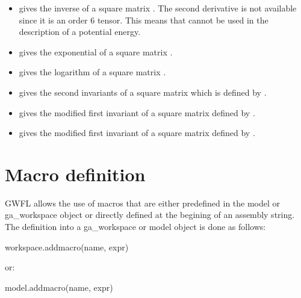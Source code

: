 \documentclass[a4paper,11pt,english]{sphinxmanual}
\begin{document}
\begin{itemize}
\item {} 
 gives the inverse of a square matrix . The second derivative is not available since it is an order 6 tensor. This means that  cannot be used in the description of a potential energy.

\item {} 
 gives the exponential of a square matrix .

\item {} 
 gives the logarithm of a square matrix .

\item {} 
 gives the second invariants of a square matrix  which is defined by .

\item {} 
 gives the modified first invariant of a square matrix defined by .

\item {} 
 gives the modified first invariant of a square matrix defined by .

\end{itemize}


\section{Macro definition}
\label{\detokenize{userdoc/gasm_high:macro-definition}}\label{\detokenize{userdoc/gasm_high:ud-gasm-high-macros}}
GWFL allows the use of macros that are either predefined in the model or ga\_workspace object or directly defined at the begining of an assembly string. The definition into a ga\_workspace or model object is done as follows:

\begin{sphinxVerbatim}[commandchars=\\\{\}]
workspace.add\PYGZus{}macro(name, expr)
\end{sphinxVerbatim}

or:

\begin{sphinxVerbatim}[commandchars=\\\{\}]
model.add\PYGZus{}macro(name, expr)
\end{sphinxVerbatim}
\end{document}
